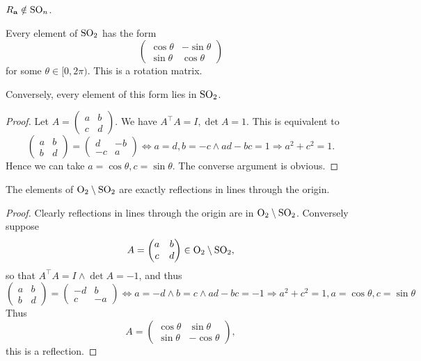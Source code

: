 \documentclass[10pt]{article}
\begin{document}
    \begin{proposition}\label{prop:7.17}
        $R_{\bf a}\notin \mathrm{SO}_n$.
    \end{proposition}
    \begin{theorem}\label{thm:7.18}
        Every element of $\mathrm{SO}_2$ has the form 
        \[
            \begin{pmatrix}
                \cos \theta& -\sin \theta\\
                \sin \theta& \cos \theta
            \end{pmatrix}
        \]
        for some $ \theta\in [0,2\pi) $. This is a rotation matrix.

        Conversely, every element of this form lies in $\mathrm{SO}_2$.
    \end{theorem}
    \begin{proof}
        Let $A= \begin{pmatrix}
            a&b\\c&d
        \end{pmatrix} $.
        We have $ A^\top A=I, \det A=1 $. This is equivalent to 
        \[
            \begin{pmatrix}
                a&b\\b&d
            \end{pmatrix}=\begin{pmatrix}
                d&-b\\-c&a
            \end{pmatrix} \Longleftrightarrow a=d,b=-c \land ad-bc=1 \Longrightarrow a^2+c^2=1.
        \]
        Hence we can take $ a=\cos \theta, c=\sin \theta $. The converse argument is obvious.
    \end{proof}
    \begin{theorem}\label{thm:7.19}
        The elements of $ \mathrm{O}_2 \setminus \mathrm{SO}_2 $ are exactly reflections in lines through the origin.
    \end{theorem}
    \begin{proof}
        Clearly reflections in lines through the origin are in $ \mathrm{O}_2 \setminus \mathrm{SO}_2 $. Conversely suppose
        \[
            A=\begin{pmatrix}
                a&b\\c&d
            \end{pmatrix}\in \mathrm{O}_2 \setminus \mathrm{SO}_2,
        \]
        so that $ A^\top A=I \land \det A=-1 $, and thus 
        \[
            \begin{pmatrix}
                a&b\\b&d
            \end{pmatrix}=\begin{pmatrix}
                -d&b\\c&-a
            \end{pmatrix} \Longleftrightarrow a=-d \land b=c \land ad-bc=-1 \Longrightarrow a^2+c^2=1, a=\cos \theta,c=\sin \theta
        \]
        Thus 
        \[
            A = \begin{pmatrix}
                \cos \theta& \sin \theta\\
                \sin \theta& -\cos \theta
            \end{pmatrix},
        \]
        this is a reflection.
    \end{proof}
\end{document}
